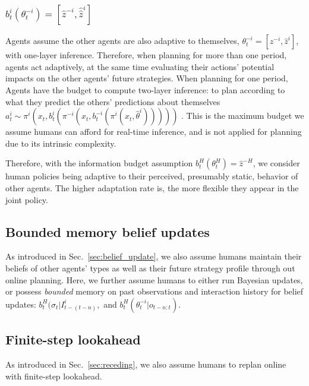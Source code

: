 \documentclass[letterpaper, 10 pt, conference]{ieeeconf}  %
\begin{document}
\subsubsection{$b^i_t(\theta^{-i}_t) = 
[\hat{z}^{-i}, 
\hat{\hat{z}}^i]$}
Agents assume the other agents are also adaptive to themselves,
$\theta^{-i}_t = [z^{-i},
\hat{z}^{i}]$, with one-layer inference. 
Therefore, when planning for more than one period, agents act adaptively, at 
the same time evaluating their actions' potential impacts on the other agents' future 
strategies. When planning for one period, Agents have the budget to compute 
two-layer inference: to plan according to what they predict the others' 
predictions about themselves 
$a^i_t \sim \pi^i(x_t, b^i_t(\pi^{-i}(x_t,b^{-i}_t(\pi^i(x_t,\hat{\theta}^i)))))$
. This is the maximum budget we assume humans can afford for real-time 
inference, and is not applied for planning due to its 
intrinsic complexity. 

Therefore, with the information budget assumption $b^H_t(\theta^H_t) = \hat{z}^{-H}$, we consider human policies 
being adaptive to their perceived, presumably static, behavior of other 
agents. The higher adaptation rate is, the more flexible they 
appear in the joint policy. 

\vspace{-.3em}
\subsection{Bounded memory belief updates}
\vspace{-.2em}
As introduced in Sec.~\ref{sec:belief_update}, we also assume humans maintain their 
beliefs of other agents' types as well as their future strategy profile 
through out online planning. 
Here, we further assume humans to either run Bayesian updates, or possess \textit{bounded} memory on past observations and 
interaction history for belief updates\cite{nikolaidis2016formalizing}: $
b^H_t(\sigma_{t}|I^i_{t-(t-n)},
$
and
$
b^H_t(\theta^{-i}_t|o_{t-n:t}).
$
\vspace{-.3em}
\subsection{Finite-step lookahead}
\vspace{-.2em}
As introduced in Sec.~\ref{sec:receding}, we also assume humans to replan 
online with finite-step lookahead. 
\end{document}
